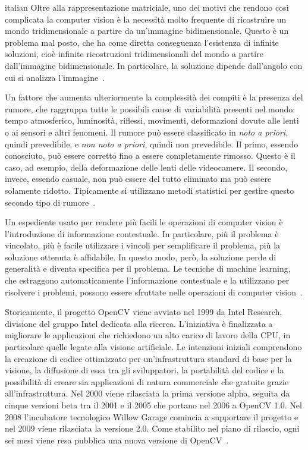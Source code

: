 \begin{otherlanguage*}{italian}
				Oltre alla rappresentazione matriciale, uno dei motivi che rendono così complicata la computer vision è la necessità molto frequente di ricostruire un mondo tridimensionale a partire da un'immagine bidimensionale. 
				Questo è un problema mal posto, che ha come diretta conseguenza l'esistenza di infinite soluzioni, cioè infinite ricostruzioni tridimensionali del mondo a partire dall'immagine bidimensionale.
				In particolare, la soluzione dipende dall'angolo con cui si analizza l'immagine~\cite{bradski2008learning}.

				Un fattore che aumenta ulteriormente la complessità dei compiti è la presenza del rumore, che raggruppa tutte le possibili cause di variabilità presenti nel mondo: tempo atmosferico, luminosità, riflessi, movimenti, deformazioni dovute alle lenti o ai sensori e altri fenomeni.
				Il rumore può essere classificato in \emph{noto a priori}, quindi prevedibile, e \emph{non noto a priori}, quindi non prevedibile. 
				Il primo, essendo conosciuto, può essere corretto fino a essere completamente rimosso.
				Questo è il caso, ad esempio, della deformazione delle lenti delle videocamere.
				Il secondo, invece, essendo casuale, non può essere del tutto eliminato ma può essere solamente ridotto.
				Tipicamente si utilizzano metodi statistici per gestire questo secondo tipo di rumore~\cite{bradski2008learning}. 
			 
				Un espediente usato per rendere più facili le operazioni di computer vision è l'introduzione di informazione contestuale. 
				In particolare, più il problema è vincolato, più è facile utilizzare i vincoli per semplificare il problema, più la soluzione ottenuta è affidabile.
				In questo modo, però, la soluzione perde di generalità e diventa specifica per il problema.
				Le tecniche di machine learning, che estraggono automaticamente l'informazione contestuale e la utilizzano per risolvere i problemi, possono essere sfruttate nelle operazioni di computer vision~\cite{bradski2008learning}.
				
				Storicamente, il progetto OpenCV viene avviato nel 1999 da Intel Research, divisione del gruppo Intel dedicata alla ricerca. 
				L'iniziativa è finalizzata a migliorare le applicazioni che richiedono un alto carico di lavoro della CPU, in particolare quelle legate alla visione artificiale. 
				Le intenzioni iniziali comprendono la creazione di codice ottimizzato per un'infrastruttura standard di base per la visione, la diffusione di essa tra gli sviluppatori, la portabilità del codice e la possibilità di creare sia applicazioni di natura commerciale che gratuite grazie all'infrastruttura. 
				Nel 2000 viene rilasciata la prima versione alpha, seguita da cinque versioni beta tra il 2001 e il 2005 che portano nel 2006 a \mbox{OpenCV} 1.0.	
				Nel 2008 l'incubatore tecnologico Willow Garage comincia a supportare il progetto e nel 2009 viene rilasciata la versione 2.0. 
				Come stabilito nel piano di rilascio, ogni sei mesi viene resa pubblica una nuova versione di \mbox{OpenCV}~\cite{OpenCV:ChangeLogs}.


\end{otherlanguage*}
